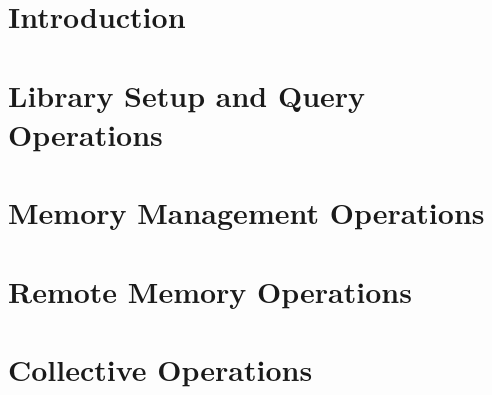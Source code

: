 \documentclass[10pt]{book}
\begin{document}
\hypersetup{pageanchor=true,citecolor=blue}

\pagestyle{fancy}
\fancyhead{}
\fancyhead[LE,LO]{\insertDocVersion}
\fancyfoot[CE,CO]{\thepage}



\setcounter{tocdepth}{2}
\tableofcontents

\mainmatter  %
\pagestyle{headings}  \withlinenumbers

\startchap
\section*{Introduction}








\startchap
\section*{Library Setup and Query Operations}%
\section*{Memory Management Operations}
\section*{Remote Memory Operations}
\startchap
\section*{Collective Operations}
\end{document}
